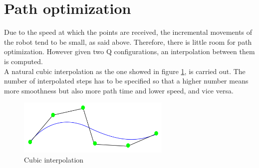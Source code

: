 
\section{Path optimization} %
\label{sec:path_optimization}
Due to the speed at which the points are received, the incremental movements of the robot tend to be small, as said above. Therefore, there is little room for path optimization. However given two Q configurations, an interpolation between them is computed.\\

A natural cubic interpolation as the one showed in figure \ref{fig:cubic interpolation}, is carried out. The number of interpolated steps has to be specified so that a higher number means more smoothness but also more path time and lower speed, and vice versa.

\begin{figure}[!ht]
	\centering
	\includegraphics[width=0.65\textwidth]{figures/cubic_interpolation}
	\caption{Cubic interpolation}
	\label{fig:cubic interpolation}
\end{figure}

